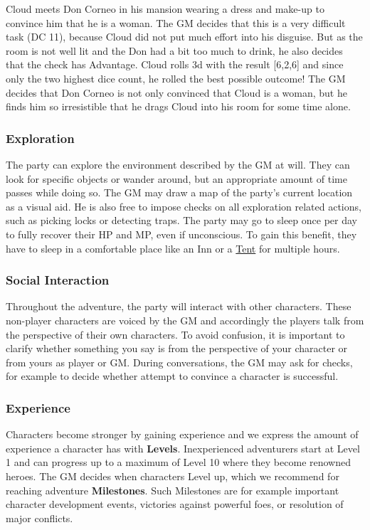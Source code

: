 \vfill

{
Cloud meets Don Corneo in his mansion wearing a dress and make-up to convince him that he is a woman.
The GM decides that this is a very difficult task (DC 11), because Cloud did not put much effort into his disguise. 
But as the room is not well lit and the Don had a bit too much to drink, he also decides that the check has Advantage. 
Cloud rolls 3d with the result [6,2,6] and since only the two highest dice count, he rolled the best possible outcome! 
The GM decides that Don Corneo is not only convinced that Cloud is a woman, but he finds him so irresistible that he drags Cloud into his room for some time alone.
}

\pagebreak

\subsubsection*{Exploration}
The party can explore the environment described by the GM at will.
They can look for specific objects or wander around, but an appropriate amount of time passes while doing so.
The GM may draw a map of the party's current location as a visual aid. 
He is also free to impose checks on all exploration related actions, such as picking locks or detecting traps.
The party may go to sleep once per day to fully recover their HP and MP, even if unconscious.
To gain this benefit, they have to sleep in a comfortable place like an Inn or a \hyperlink{item}{Tent} for multiple hours.

\vfill

\subsubsection*{Social Interaction}
Throughout the adventure, the party will interact with other characters.
These non-player characters are voiced by the GM and accordingly the players talk from the perspective of their own characters.
To avoid confusion, it is important to clarify whether something you say is from the perspective of your character or from yours as player or GM.
During conversations, the GM may ask for checks, for example to decide whether attempt to convince a character is successful.

\vfill

\subsubsection*{Experience}
Characters become stronger by gaining experience and we express the amount of experience a character has with \textbf{Levels}.
Inexperienced adventurers start at Level 1 and can progress up to a maximum of Level 10 where they become renowned heroes. 
The GM decides when characters Level up, which we recommend for reaching adventure \mbox{\textbf{\hypertarget{ms}{Milestones}}}.
Such Milestones are for example important character development events, victories against powerful foes, or resolution of major conflicts. 

